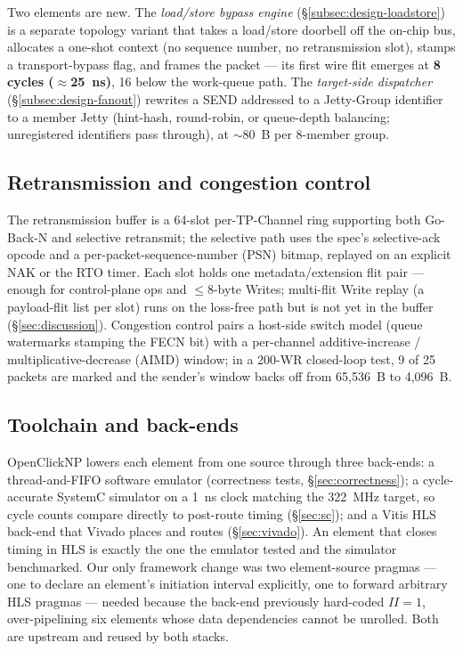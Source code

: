 \documentclass[10pt,twocolumn]{article}
\begin{document}
Two elements are new. The \emph{load/store bypass engine}
(\S\ref{subsec:design-loadstore}) is a separate topology variant
that takes a load/store doorbell off the on-chip bus, allocates a
one-shot context (no sequence number, no retransmission slot),
stamps a transport-bypass flag, and frames the packet --- its first
wire flit emerges at \textbf{8 cycles ($\approx$25~ns)}, 16 below
the work-queue path. The \emph{target-side dispatcher}
(\S\ref{subsec:design-fanout}) rewrites a SEND addressed to a
Jetty-Group identifier to a member Jetty (hint-hash, round-robin,
or queue-depth balancing; unregistered identifiers pass through),
at $\sim$80~B per 8-member group.

\subsection{Retransmission and congestion control}
\label{subsec:impl-retrans}

The retransmission buffer is a 64-slot per-TP-Channel ring
supporting both Go-Back-N and selective retransmit; the selective
path uses the spec's selective-ack opcode and a
per-packet-sequence-number (PSN) bitmap, replayed on an explicit
NAK or the RTO timer. Each slot holds one metadata/extension flit
pair --- enough for control-plane ops and $\le$8-byte Writes;
multi-flit Write replay (a payload-flit list per slot) runs on the
loss-free path but is not yet in the buffer
(\S\ref{sec:discussion}). Congestion control pairs a host-side
switch model (queue watermarks stamping the FECN bit) with a
per-channel additive-increase / multiplicative-decrease (AIMD)
window; in a 200-WR closed-loop test, 9 of 25 packets are marked
and the sender's window backs off from 65{,}536~B to 4{,}096~B.

\subsection{Toolchain and back-ends}
\label{subsec:impl-backends}

OpenClickNP lowers each element from one source through three
back-ends: a thread-and-FIFO software emulator (correctness tests,
\S\ref{sec:correctness}); a cycle-accurate SystemC simulator on a
1~ns clock matching the 322~MHz target, so cycle counts compare
directly to post-route timing (\S\ref{sec:sc}); and a Vitis HLS
back-end that Vivado places and routes (\S\ref{sec:vivado}). An
element that closes timing in HLS is exactly the one the emulator
tested and the simulator benchmarked. Our only framework change
was two element-source pragmas --- one to declare an element's
initiation interval explicitly, one to forward arbitrary HLS
pragmas --- needed because the back-end previously hard-coded
$II{=}1$, over-pipelining six elements whose data dependencies
cannot be unrolled. Both are upstream and reused by both stacks.
\end{document}
